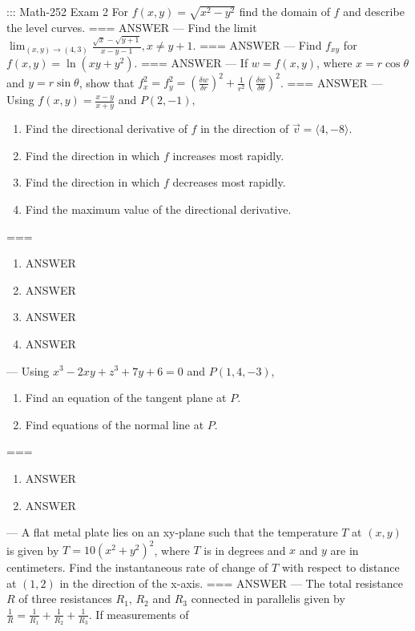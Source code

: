 ::: Math-252 Exam 2
For \(f(x,y)=\sqrt{x^2-y^2}\) find the domain of \(f\) and describe the level
curves.
===
ANSWER
---
Find the limit \(\lim_{(x,y)\to(4,3)}\frac{\sqrt x-\sqrt{y+1}}{x-y-1},x\neq
y+1\).
===
ANSWER
---
Find \(f_{xy}\) for \(f(x,y)=\ln(xy+y^2)\).
===
ANSWER
---
If \(w=f(x,y)\), where \(x=r\cos\theta\) and \(y=r\sin\theta\), show that
\(f_x^2=f_y^2=(\frac{\delta w}{\delta r})^2+\frac{1}{r^2}(\frac{\delta
w}{\delta\theta})^2\).
===
ANSWER
---
Using \(f(x,y)=\frac{x-y}{x+y}\) and \(P(2,-1)\),
\begin{enumerate}[label=\alph*.]
  \item Find the directional derivative of \(f\) in the direction of \(\vec
    v=\langle 4,-8\rangle\).
  \item Find the direction in which \(f\) increases most rapidly.
  \item Find the direction in which \(f\) decreases most rapidly.
  \item Find the maximum value of the directional derivative.
\end{enumerate}
===
\begin{enumerate}[label=\alph*.]
  \item ANSWER
  \item ANSWER
  \item ANSWER
  \item ANSWER
\end{enumerate}
---
Using \(x^3-2xy+z^3+7y+6=0\) and \(P(1,4,-3)\),
\begin{enumerate}[label=\alph*.]
  \item Find an equation of the tangent plane at \(P\).
  \item Find equations of the normal line at \(P\).
\end{enumerate}
===
\begin{enumerate}[label=\alph*.]
  \item ANSWER
  \item ANSWER
\end{enumerate}
---
A flat metal plate lies on an xy-plane such that the temperature \(T\) at
\((x,y)\) is given by \(T=10(x^2+y^2)^2\), where \(T\) is in degrees and \(x\)
and \(y\) are in centimeters. Find the instantaneous rate of change of \(T\)
with respect to distance at \((1,2)\) in the direction of the x-axis.
===
ANSWER
---
The total resistance \(R\) of three resistances \(R_1\), \(R_2\) and \(R_3\)
connected in parallelis given by
\(\frac{1}{R}=\frac{1}{R_1}+\frac{1}{R_2}+\frac{1}{R_3}\). If measurements of
